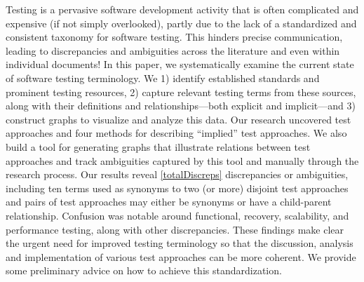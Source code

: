 \label{abstract}%
Testing is a pervasive software development activity that is often
complicated and expensive (if not simply overlooked), partly due to
the lack of a standardized and consistent taxonomy for software testing.
This hinders precise communication, leading to discrepancies and
ambiguities across the literature and even within individual documents!
In this paper, we systematically examine the current state of software
testing terminology. We 1) identify established standards
and prominent testing resources, 2) capture relevant testing terms
from these sources, along with their definitions and relationships---both
explicit and implicit---and 3) construct graphs to visualize and analyze
this data. Our research uncovered \approachCount{} test approaches and
four methods for describing ``implied'' test approaches. We also build
a tool for generating graphs that illustrate relations between test
approaches and track ambiguities captured by this tool and manually through
the research process. Our results reveal \ref*{totalDiscreps} discrepancies
or ambiguities, including ten terms used as synonyms to two (or more)
disjoint test approaches and \parSynAll{} pairs of test approaches may
either be synonyms or have a child-parent relationship. Confusion was notable
around functional, recovery, scalability, and performance testing, along
with  other discrepancies. These findings make clear
the urgent need for improved testing terminology so that the discussion,
analysis and implementation of various test approaches can be more coherent.
We provide some preliminary advice on how to achieve this standardization.